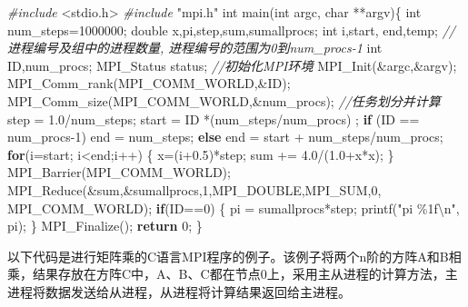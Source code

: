 \documentclass[]{ctexbook}
\newenvironment{Shaded}{\begin{snugshade}}{\end{snugshade}}
\newcommand{\CommentTok}[1]{\textcolor[rgb]{0.56,0.35,0.01}{\textit{#1}}}
\newcommand{\ControlFlowTok}[1]{\textcolor[rgb]{0.13,0.29,0.53}{\textbf{#1}}}
\newcommand{\DataTypeTok}[1]{\textcolor[rgb]{0.13,0.29,0.53}{#1}}
\newcommand{\DecValTok}[1]{\textcolor[rgb]{0.00,0.00,0.81}{#1}}
\newcommand{\FloatTok}[1]{\textcolor[rgb]{0.00,0.00,0.81}{#1}}
\newcommand{\ImportTok}[1]{#1}
\newcommand{\NormalTok}[1]{#1}
\newcommand{\PreprocessorTok}[1]{\textcolor[rgb]{0.56,0.35,0.01}{\textit{#1}}}
\newcommand{\SpecialCharTok}[1]{\textcolor[rgb]{0.00,0.00,0.00}{#1}}
\newcommand{\StringTok}[1]{\textcolor[rgb]{0.31,0.60,0.02}{#1}}
\begin{document}
\begin{Shaded}
\begin{Highlighting}[]
\PreprocessorTok{\#include }\ImportTok{\textless{}stdio.h\textgreater{}}
\PreprocessorTok{\#include }\ImportTok{"mpi.h"}
\DataTypeTok{int}\NormalTok{ main(}\DataTypeTok{int}\NormalTok{ argc, }\DataTypeTok{char}\NormalTok{ **argv)\{}
    \DataTypeTok{int}\NormalTok{ num\_steps=}\DecValTok{1000000}\NormalTok{;}
    \DataTypeTok{double}\NormalTok{ x,pi,step,sum,sumallprocs;}
    \DataTypeTok{int}\NormalTok{  i,start, end,temp;}
    \CommentTok{//进程编号及组中的进程数量, 进程编号的范围为0到num\_procs{-}1}
    \DataTypeTok{int}\NormalTok{ ID,num\_procs;}
\NormalTok{    MPI\_Status status;}
    \CommentTok{//初始化MPI环境}
\NormalTok{    MPI\_Init(\&argc,\&argv);}
\NormalTok{    MPI\_Comm\_rank(MPI\_COMM\_WORLD,\&ID);}
\NormalTok{    MPI\_Comm\_size(MPI\_COMM\_WORLD,\&num\_procs);}
    \CommentTok{//任务划分并计算}
\NormalTok{    step = }\FloatTok{1.0}\NormalTok{/num\_steps;}
\NormalTok{    start = ID *(num\_steps/num\_procs) ;}
    \ControlFlowTok{if}\NormalTok{ (ID == num\_procs{-}}\DecValTok{1}\NormalTok{)}
\NormalTok{        end = num\_steps;}
    \ControlFlowTok{else}
\NormalTok{        end = start + num\_steps/num\_procs;}
    \ControlFlowTok{for}\NormalTok{(i=start; i\textless{}end;i++) \{}
\NormalTok{        x=(i+}\FloatTok{0.5}\NormalTok{)*step;}
\NormalTok{        sum += }\FloatTok{4.0}\NormalTok{/(}\FloatTok{1.0}\NormalTok{+x*x);}
\NormalTok{    \}}
\NormalTok{    MPI\_Barrier(MPI\_COMM\_WORLD);}
\NormalTok{    MPI\_Reduce(\&sum,\&sumallprocs,}\DecValTok{1}\NormalTok{,MPI\_DOUBLE,MPI\_SUM,}\DecValTok{0}\NormalTok{, MPI\_COMM\_WORLD);}
    \ControlFlowTok{if}\NormalTok{(ID==}\DecValTok{0}\NormalTok{) \{}
\NormalTok{        pi = sumallprocs*step;}
\NormalTok{        printf(}\StringTok{"pi \%1f}\SpecialCharTok{\textbackslash{}n}\StringTok{"}\NormalTok{, pi);}
\NormalTok{    \}}
\NormalTok{    MPI\_Finalize();}
    \ControlFlowTok{return} \DecValTok{0}\NormalTok{;}
\NormalTok{\}}
\end{Highlighting}
\end{Shaded}

以下代码是进行矩阵乘的C语言MPI程序的例子。该例子将两个n阶的方阵A和B相乘，结果存放在方阵C中，A、B、C都在节点0上，采用主从进程的计算方法，主进程将数据发送给从进程，从进程将计算结果返回给主进程。
\end{document}
